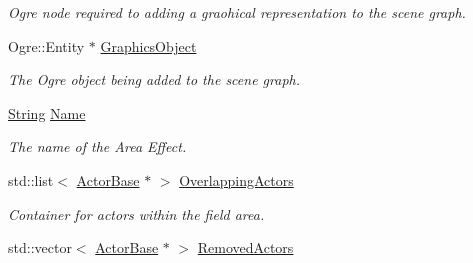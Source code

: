 \begin{DoxyCompactItemize}
\begin{DoxyCompactList}\small\item\em Ogre node required to adding a graohical representation to the scene graph. \item\end{DoxyCompactList}\item 
\hypertarget{classMezzanine_1_1AreaEffect_a673167414883d918da6fb57f340e850e}{
Ogre::Entity $\ast$ \hyperlink{classMezzanine_1_1AreaEffect_a673167414883d918da6fb57f340e850e}{GraphicsObject}}
\label{classMezzanine_1_1AreaEffect_a673167414883d918da6fb57f340e850e}

\begin{DoxyCompactList}\small\item\em The Ogre object being added to the scene graph. \item\end{DoxyCompactList}\item 
\hypertarget{classMezzanine_1_1AreaEffect_ad2b27c925a2eaa40fe03db4205f3de39}{
\hyperlink{namespaceMezzanine_acf9fcc130e6ebf08e3d8491aebcf1c86}{String} \hyperlink{classMezzanine_1_1AreaEffect_ad2b27c925a2eaa40fe03db4205f3de39}{Name}}
\label{classMezzanine_1_1AreaEffect_ad2b27c925a2eaa40fe03db4205f3de39}

\begin{DoxyCompactList}\small\item\em The name of the Area Effect. \item\end{DoxyCompactList}\item 
\hypertarget{classMezzanine_1_1AreaEffect_a9a1dbe79efda62adad5f56b5f93813ca}{
std::list$<$ \hyperlink{classMezzanine_1_1ActorBase}{ActorBase} $\ast$ $>$ \hyperlink{classMezzanine_1_1AreaEffect_a9a1dbe79efda62adad5f56b5f93813ca}{OverlappingActors}}
\label{classMezzanine_1_1AreaEffect_a9a1dbe79efda62adad5f56b5f93813ca}

\begin{DoxyCompactList}\small\item\em Container for actors within the field area. \item\end{DoxyCompactList}\item 
\hypertarget{classMezzanine_1_1AreaEffect_adaab6a94b9c4a9cfdb917ff4ce3fcabf}{
std::vector$<$ \hyperlink{classMezzanine_1_1ActorBase}{ActorBase} $\ast$ $>$ \hyperlink{classMezzanine_1_1AreaEffect_adaab6a94b9c4a9cfdb917ff4ce3fcabf}{RemovedActors}}
\label{classMezzanine_1_1AreaEffect_adaab6a94b9c4a9cfdb917ff4ce3fcabf}


\end{DoxyCompactItemize}

